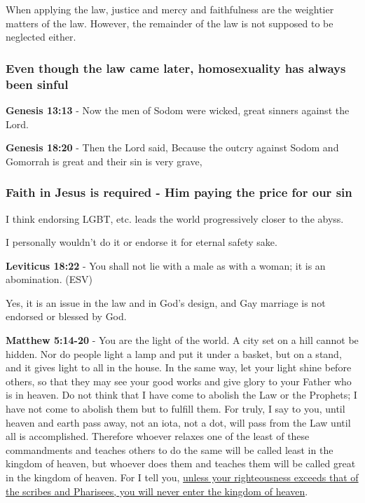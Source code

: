 \documentclass[11pt]{article}
\begin{document}
When applying the law, justice and mercy and faithfulness are the weightier matters of the law.
However, the remainder of the law is not supposed to be neglected either.

\subsubsection{Even though the law came later, homosexuality has always been sinful}
\label{sec:org529b038}
\textbf{Genesis 13:13} - Now the men of Sodom were wicked, great sinners against the Lord.

\textbf{Genesis 18:20} - Then the Lord said, Because the outcry against Sodom and Gomorrah is great and their sin is very grave,

\subsubsection{Faith in Jesus is required - Him paying the price for our sin}
\label{sec:orgf00f5a4}

I think endorsing LGBT, etc. leads the world progressively closer to the abyss.

I personally wouldn't do it or endorse it for eternal safety sake.

\textbf{Leviticus 18:22} - You shall not lie with a male as with a woman; it is an abomination. (ESV)

Yes, it is an issue in the law and in God's design, and Gay marriage is not endorsed or blessed by God.

\textbf{Matthew 5:14-20} - You are the light of the world. A city set on a hill cannot be hidden. Nor do people light a lamp and put it under a basket, but on a stand, and it gives light to all in the house. In the same way, let your light shine before others, so that they may see your good works and give glory to your Father who is in heaven. Do not think that I have come to abolish the Law or the Prophets; I have not come to abolish them but to fulfill them. For truly, I say to you, until heaven and earth pass away, not an iota, not a dot, will pass from the Law until all is accomplished. Therefore whoever relaxes one of the least of these commandments and teaches others to do the same will be called least in the kingdom of heaven, but whoever does them and teaches them will be called great in the kingdom of heaven. For I tell you, \uline{unless your righteousness exceeds that of the scribes and Pharisees, you will never enter the kingdom of heaven}.
\end{document}
